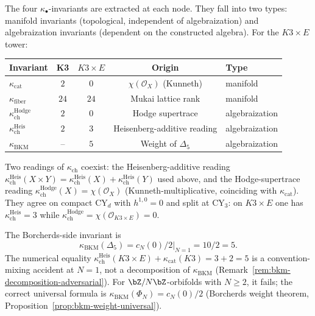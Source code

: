 The four $\kappa_\bullet$-invariants are extracted at each node.
They fall into two types: manifold invariants (topological,
independent of algebraization) and algebraization invariants (dependent
on the constructed algebra). For the $K3 \times E$ tower:

\begin{center}
\renewcommand{\arraystretch}{1.3}
\begin{tabular}{lcccl}
\hline
\textbf{Invariant} & \textbf{K3} & \textbf{$K3 \times E$} & \textbf{Origin} & \textbf{Type} \\
\hline
$\kappa_{\mathrm{cat}}$ & $2$ & $0$ & $\chi(\mathcal{O}_X)$ (Kunneth) & manifold \\
$\kappa_{\mathrm{fiber}}$ & $24$ & $24$ & Mukai lattice rank & manifold \\
$\kappa_{\mathrm{ch}}^{\mathrm{Hodge}}$ & $2$ & $0$ & Hodge supertrace & algebraization \\
$\kappa_{\mathrm{ch}}^{\mathrm{Heis}}$ & $2$ & $3$ & Heisenberg-additive reading & algebraization \\
$\kappa_{\mathrm{BKM}}$ & -- & $5$ & Weight of $\Delta_5$ & algebraization \\
\hline
\end{tabular}
\end{center}

\noindent
Two readings of $\kappa_{\mathrm{ch}}$ coexist: the Heisenberg-additive
reading $\kappa_{\mathrm{ch}}^{\mathrm{Heis}}(X \times Y) =
\kappa_{\mathrm{ch}}^{\mathrm{Heis}}(X) + \kappa_{\mathrm{ch}}^{\mathrm{Heis}}(Y)$
used above, and the Hodge-supertrace reading
$\kappa_{\mathrm{ch}}^{\mathrm{Hodge}}(X) = \chi(\mathcal{O}_X)$
(Kunneth-multiplicative, coinciding with $\kappa_{\mathrm{cat}}$). They
agree on compact $\mathrm{CY}_d$ with $h^{1, 0} = 0$ and split at
$\mathrm{CY}_3$: on $K3 \times E$ one has
$\kappa_{\mathrm{ch}}^{\mathrm{Heis}} = 3$ while
$\kappa_{\mathrm{ch}}^{\mathrm{Hodge}} = \chi(\mathcal{O}_{K3 \times E}) = 0$.

\noindent
The Borcherds-side invariant is
\begin{equation}
\label{eq:kappa-bkm-decomposition}
 \kappa_{\mathrm{BKM}}(\Delta_5)
 = \left.c_N(0)/2\right|_{N=1}
 = 10/2 = 5.
\end{equation}
The numerical equality
$\kappa_{\mathrm{ch}}^{\mathrm{Heis}}(K3 \times E)+\kappa_{\mathrm{cat}}(K3)=3+2=5$
is a convention-mixing accident at $N=1$, not a decomposition of
$\kappa_{\mathrm{BKM}}$ (Remark~\ref{rem:bkm-decomposition-adversarial}).
For $\bZ/N\bZ$-orbifolds with $N \geq 2$, it fails; the correct universal formula is $\kappa_{\mathrm{BKM}}(\Phi_N) = c_N(0)/2$ (Borcherds weight theorem, Proposition~\ref{prop:bkm-weight-universal}).

